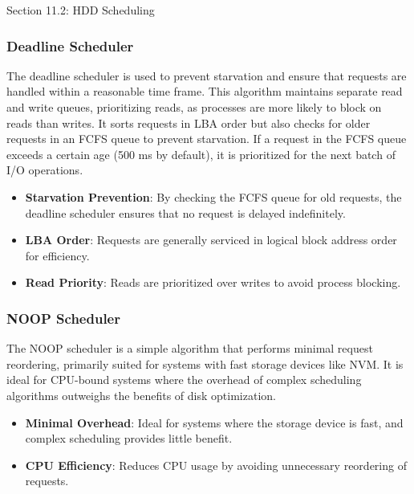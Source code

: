 \begin{notes}{Section 11.2: HDD Scheduling}
\begin{highlight}
    \end{highlight}
    
    \subsubsection*{Deadline Scheduler}
    
    The deadline scheduler is used to prevent starvation and ensure that requests are handled within a reasonable time frame. This algorithm maintains separate read and write queues, prioritizing reads, 
    as processes are more likely to block on reads than writes. It sorts requests in LBA order but also checks for older requests in an FCFS queue to prevent starvation. If a request in the FCFS queue 
    exceeds a certain age (500 ms by default), it is prioritized for the next batch of I/O operations.
    
    \begin{highlight}
    
        \begin{itemize}
            \item \textbf{Starvation Prevention}: By checking the FCFS queue for old requests, the deadline scheduler ensures that no request is delayed indefinitely.
            \item \textbf{LBA Order}: Requests are generally serviced in logical block address order for efficiency.
            \item \textbf{Read Priority}: Reads are prioritized over writes to avoid process blocking.
        \end{itemize}
    
    \end{highlight}
    
    \subsubsection*{NOOP Scheduler}
    
    The NOOP scheduler is a simple algorithm that performs minimal request reordering, primarily suited for systems with fast storage devices like NVM. It is ideal for CPU-bound systems where the overhead 
    of complex scheduling algorithms outweighs the benefits of disk optimization.
    
    \begin{highlight}
    
        \begin{itemize}
            \item \textbf{Minimal Overhead}: Ideal for systems where the storage device is fast, and complex scheduling provides little benefit.
            \item \textbf{CPU Efficiency}: Reduces CPU usage by avoiding unnecessary reordering of requests.
        \end{itemize}
    

\end{highlight}
\end{notes}
